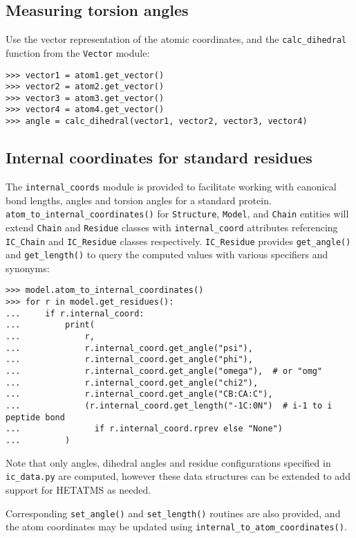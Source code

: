 \subsection{Measuring torsion angles}
Use  the vector representation of the atomic coordinates, and
the \texttt{calc\_dihedral} function from the \texttt{Vector} module:
\begin{verbatim}
>>> vector1 = atom1.get_vector()
>>> vector2 = atom2.get_vector()
>>> vector3 = atom3.get_vector()
>>> vector4 = atom4.get_vector()
>>> angle = calc_dihedral(vector1, vector2, vector3, vector4)
\end{verbatim}

\subsection{Internal coordinates for standard residues}
The \texttt{internal\_coords} module is provided to facilitate working with canonical bond lengths,
angles and torsion angles for a standard protein.  \texttt{atom\_to\_internal\_coordinates()} for 
\texttt{Structure}, \texttt{Model}, and \texttt{Chain} entities
will extend \texttt{Chain} and \texttt{Residue} classes with \texttt{internal\_coord} attributes referencing 
\texttt{IC\_Chain} and \texttt{IC\_Residue}
classes respectively.  \texttt{IC\_Residue} provides \texttt{get\_angle()} and \texttt{get\_length()}
to query the computed values with various specifiers and synonyms:
\begin{verbatim}
>>> model.atom_to_internal_coordinates()
>>> for r in model.get_residues():
...     if r.internal_coord:
...         print(
...             r,
...             r.internal_coord.get_angle("psi"),
...             r.internal_coord.get_angle("phi"),
...             r.internal_coord.get_angle("omega"),  # or "omg"
...             r.internal_coord.get_angle("chi2"),
...             r.internal_coord.get_angle("CB:CA:C"),
...             (r.internal_coord.get_length("-1C:0N")  # i-1 to i peptide bond
...               if r.internal_coord.rprev else "None")
...         )
\end{verbatim}
Note that only angles, dihedral angles and residue configurations specified in \texttt{ic\_data.py} are computed, 
however these data structures can be extended to add support for HETATMS as needed.
 
Corresponding \texttt{set\_angle()} and \texttt{set\_length()} routines are also provided, and the atom coordinates 
may be updated using \texttt{internal\_to\_atom\_coordinates()}.

